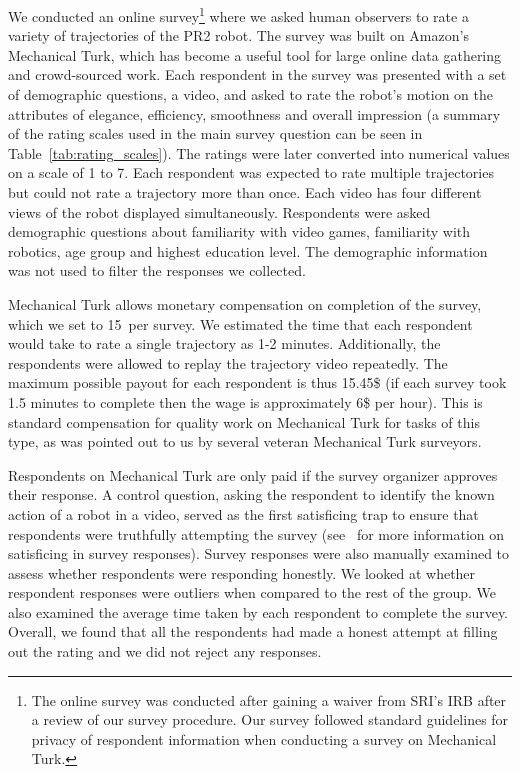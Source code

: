 \documentclass[letterpaper, 10 pt, conference]{ieeeconf}  %
\begin{document}
We conducted an online survey\footnote{The online survey was conducted after gaining a waiver from SRI's IRB after a review of our survey procedure. Our survey followed standard guidelines for privacy of respondent information when conducting a survey on Mechanical Turk.} where we asked human observers to rate a variety of trajectories of the PR2 robot. The survey was built on Amazon's Mechanical Turk, which has become a useful tool for large online data gathering and crowd-sourced work. Each respondent in the survey was presented with a set of demographic questions, a video, and asked to rate the robot's motion on the attributes  of elegance, efficiency, smoothness and overall impression (a summary of the rating scales used in the main survey question can be seen in Table~\ref{tab:rating_scales}). The ratings were later converted into numerical values on a scale of 1 to 7. Each respondent was expected to rate multiple trajectories but could not rate a trajectory more than once. Each video has four different views of the robot displayed simultaneously. Respondents were asked demographic questions about familiarity with video games, familiarity with robotics, age group and highest education level. The demographic information was not used to filter the responses we collected.  

Mechanical Turk allows monetary compensation on completion of the survey, which we set to 15\textcent~per survey. We estimated the time that each respondent would take to rate a single trajectory as 1-2 minutes. Additionally, the respondents were allowed to replay the trajectory video repeatedly. The maximum possible payout for each respondent is thus 15.45\$ (if each survey took 1.5 minutes to complete then the wage is approximately 6\$ per hour). This is standard compensation for quality work on Mechanical Turk for tasks of this type, as was pointed out to us by several veteran Mechanical Turk surveyors. 

Respondents on Mechanical Turk are only paid if the survey organizer approves their response. A control question, asking the respondent to identify the known action of a robot in a video, served as the first satisficing trap to ensure that respondents were truthfully attempting the survey (see~\cite{krosnick1996satisficing} for more information on satisficing in survey responses). Survey responses were also manually examined to assess whether respondents were responding honestly. We looked at whether respondent responses were outliers when compared to the rest of the group. We also examined the average time taken by each respondent to complete the survey. Overall, we found that all the respondents had made a honest attempt at filling out the rating and we did not reject any responses. 
\end{document}
